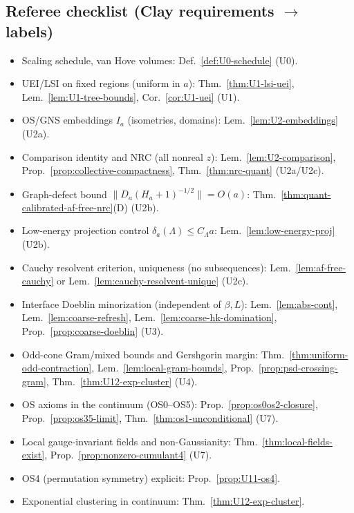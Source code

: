 \documentclass[11pt]{amsart}
\theoremstyle{plain}
\theoremstyle{definition}
\theoremstyle{remark}
\begin{document}
\subsection*{Referee checklist (Clay requirements $\to$ labels)}
\begin{itemize}
  \item Scaling schedule, van Hove volumes: Def.~\ref{def:U0-schedule} (U0).
  \item UEI/LSI on fixed regions (uniform in $a$): Thm.~\ref{thm:U1-lsi-uei}, Lem.~\ref{lem:U1-tree-bounds}, Cor.~\ref{cor:U1-uei} (U1).
  \item OS/GNS embeddings $I_a$ (isometries, domains): Lem.~\ref{lem:U2-embeddings} (U2a).
  \item Comparison identity and NRC (all nonreal $z$): Lem.~\ref{lem:U2-comparison}, Prop.~\ref{prop:collective-compactness}, Thm.~\ref{thm:nrc-quant} (U2a/U2c).
  \item Graph-defect bound $\|D_a(H_a+1)^{-1/2}\|=O(a)$: Thm.~\ref{thm:quant-calibrated-af-free-nrc}(D) (U2b).
  \item Low-energy projection control $\delta_a(\Lambda)\le C_\Lambda a$: Lem.~\ref{lem:low-energy-proj} (U2b).
  \item Cauchy resolvent criterion, uniqueness (no subsequences): Lem.~\ref{lem:af-free-cauchy} or Lem.~\ref{lem:cauchy-resolvent-unique} (U2c).
  \item Interface Doeblin minorization (independent of $\beta,L$): Lem.~\ref{lem:abs-cont}, Lem.~\ref{lem:coarse-refresh}, Lem.~\ref{lem:coarse-hk-domination}, Prop.~\ref{prop:coarse-doeblin} (U3).
  \item Odd-cone Gram/mixed bounds and Gershgorin margin: Thm.~\ref{thm:uniform-odd-contraction}, Lem.~\ref{lem:local-gram-bounds}, Prop.~\ref{prop:psd-crossing-gram}, Thm.~\ref{thm:U12-exp-cluster} (U4).
  \item OS axioms in the continuum (OS0–OS5): Prop.~\ref{prop:os0os2-closure}, Prop.~\ref{prop:os35-limit}, Thm.~\ref{thm:os1-unconditional} (U7).
  \item Local gauge-invariant fields and non-Gaussianity: Thm.~\ref{thm:local-fields-exist}, Prop.~\ref{prop:nonzero-cumulant4} (U7).
  \item OS4 (permutation symmetry) explicit: Prop.~\ref{prop:U11-os4}.
  \item Exponential clustering in continuum: Thm.~\ref{thm:U12-exp-cluster}.
\end{itemize}
\end{document}
